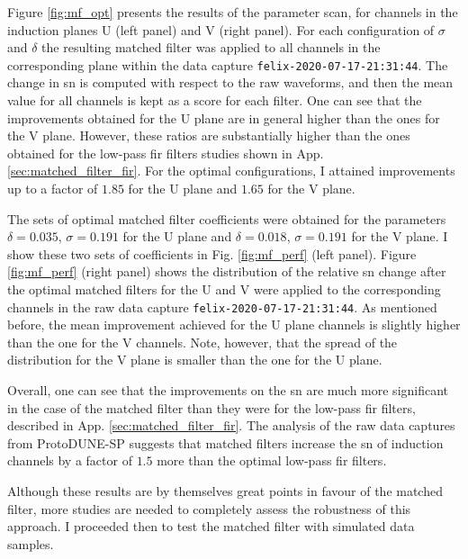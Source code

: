 Figure \ref{fig:mf_opt} presents the results of the parameter scan, for channels in the induction planes U (left panel) and V (right panel). For each configuration of $\sigma$ and $\delta$ the resulting matched filter was applied to all channels in the corresponding plane within the data capture \texttt{felix-2020-07-17-21:31:44}. The change in \gls{sn} is computed with respect to the raw waveforms, and then the mean value for all channels is kept as a score for each filter. One can see that the improvements obtained for the U plane are in general higher than the ones for the V plane. However, these ratios are substantially higher than the ones obtained for the low-pass \gls{fir} filters studies shown in App. \ref{sec:matched_filter_fir}. For the optimal configurations, I attained improvements up to a factor of $1.85$ for the U plane and $1.65$ for the V plane.

The sets of optimal matched filter coefficients were obtained for the parameters $\delta = 0.035$, $\sigma = 0.191$ for the U plane and $\delta = 0.018$, $\sigma = 0.191$ for the V plane. I show these two sets of coefficients in Fig. \ref{fig:mf_perf} (left panel). Figure \ref{fig:mf_perf} (right panel) shows the distribution of the relative \gls{sn} change after the optimal matched filters for the U and V were applied to the corresponding channels in the raw data capture \texttt{felix-2020-07-17-21:31:44}. As mentioned before, the mean improvement achieved for the U plane channels is slightly higher than the one for the V channels. Note, however, that the spread of the distribution for the V plane is smaller than the one for the U plane.

Overall, one can see that the improvements on the \gls{sn} are much more significant in the case of the matched filter than they were for the low-pass \gls{fir} filters, described in App. \ref{sec:matched_filter_fir}. The analysis of the raw data captures from ProtoDUNE-SP suggests that matched filters increase the \gls{sn} of induction channels by a factor of $1.5$ more than the optimal low-pass \gls{fir} filters.

Although these results are by themselves great points in favour of the matched filter, more studies are needed to completely assess the robustness of this approach. I proceeded then to test the matched filter with simulated data samples.

